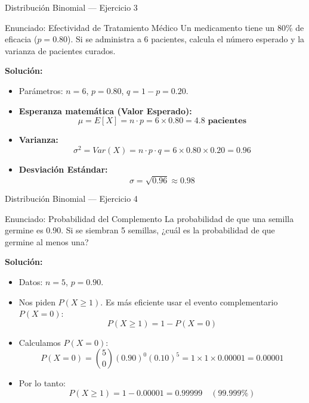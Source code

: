 \documentclass[aspectratio=169, 10pt]{beamer}
\begin{document}
\begin{frame}{Distribución Binomial — Ejercicio 3}
    \begin{exampleblock}{Enunciado: Efectividad de Tratamiento Médico}
        Un medicamento tiene un 80\% de eficacia ($p=0.80$). Si se administra a 6 pacientes, calcula el número esperado y la varianza de pacientes curados.
    \end{exampleblock}
        \pause
    \textbf{Solución:}
    \begin{itemize}
        \item Parámetros: $n = 6$, $p = 0.80$, $q = 1 - p = 0.20$.
        \vspace{0.2cm}
        \item \textbf{Esperanza matemática (Valor Esperado):}
        $$\mu = E[X] = n \cdot p = 6 \times 0.80 = \mathbf{4.8 \text{ pacientes}}$$
        
        \item \textbf{Varianza:}
        $$\sigma^2 = Var(X) = n \cdot p \cdot q = 6 \times 0.80 \times 0.20 = \mathbf{0.96}$$
        
        \item \textbf{Desviación Estándar:}
        $$\sigma = \sqrt{0.96} \approx \mathbf{0.98}$$
    \end{itemize}
\end{frame}

\begin{frame}{Distribución Binomial — Ejercicio 4}
    \begin{exampleblock}{Enunciado: Probabilidad del Complemento}
        La probabilidad de que una semilla germine es 0.90. Si se siembran 5 semillas, ¿cuál es la probabilidad de que germine al menos una?
    \end{exampleblock}
        \pause
    \textbf{Solución:}
    \begin{itemize}
        \item Datos: $n = 5$, $p = 0.90$.
        \item Nos piden $P(X \ge 1)$. Es más eficiente usar el evento complementario $P(X = 0)$:
        $$P(X \ge 1) = 1 - P(X = 0)$$
        \item Calculamos $P(X = 0)$:
        $$P(X = 0) = \binom{5}{0} (0.90)^0 (0.10)^5 = 1 \times 1 \times 0.00001 = 0.00001$$
        \item Por lo tanto:
        $$P(X \ge 1) = 1 - 0.00001 = \mathbf{0.99999} \quad (99.999\%)$$
    \end{itemize}
\end{frame}
\end{document}
